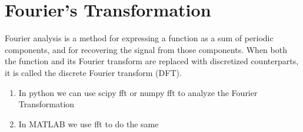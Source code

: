 \documentclass[11pt,a4paper]{article}
\begin{document}
\section{Fourier's Transformation} %
	Fourier analysis is a method for expressing a function as a sum of periodic components, and for recovering the signal from those components. 
	When both the function and its Fourier transform are replaced with discretized counterparts, it is called the discrete Fourier transform (DFT).
	\newline
	\begin{enumerate}
	    \item In python we can use scipy fft or numpy fft to analyze the Fourier
	        Transformation
	    \item In MATLAB we use fft to do the same
	  \end{enumerate}
\end{document}
